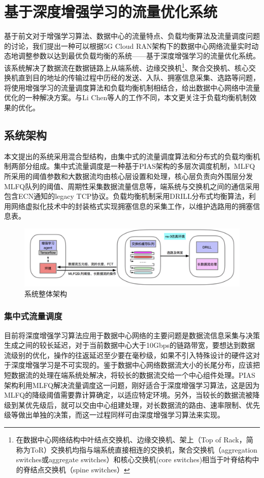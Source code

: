 
\chapter{基于深度增强学习的流量优化系统}
\label{chap:System}
基于前文对于增强学习算法、数据中心的流量特点、负载均衡算法及流量调度问题的讨论，我们提出一种可以根据5G Cloud RAN架构下的数据中心网络流量实时动态地调整参数以达到最优负载均衡的系统——基于深度增强学习的流量优化系统。该系统解决了数据流在数据链路上从端系统、边缘交换机\footnote{在数据中心网络结构中叶结点交换机、边缘交换机、架上（Top of Rack，简称为ToR）交换机均指与端系统直接相连的交换机，聚合交换机（aggregation switches或aggregate switches）和核心交换机(core switches)相当于叶脊结构中的脊结点交换机（spine switches）}、聚合交换机、核心交换机直到目的地址的传输过程中历经的发送、入队、拥塞信息采集、选路等问题，将使用增强学习的流量调度算法和负载均衡机制相结合，给出数据中心网络中流量优化的一种解决方案。与Li Chen等人的工作\cite{chen2018auto}不同，本文更关注于负载均衡机制效果的优化。

\section{系统架构}
本文提出的系统采用混合型结构，由集中式的流量调度算法和分布式的负载均衡机制两部分组成。集中式流量调度是一种基于PIAS架构的多层次调度机制，MLFQ所采用的阈值参数和大数据流均由核心层设置和处理，核心层负责向外围层分发MLFQ队列的阈值、周期性采集数据流量信息等，端系统与交换机之间的通信采用包含ECN通知的legacy TCP协议。负载均衡机制采用DRILL分布式均衡算法，利用网络虚拟化技术中的封装格式实现拥塞信息的采集工作，以维护选路用的拥塞信息表。

\begin{figure}[ht]
\centering
\includegraphics[width=16cm]{figure/architecture.png}
\caption{系统整体架构}
\label{fig:architecture}
\end{figure}
\subsection{集中式流量调度}
目前将深度增强学习算法应用于数据中心网络的主要问题是数据流信息采集与决策生成之间的较长延迟，对于当前数据中心大于10Gbps的链路带宽，要想达到数据流级别的优化，操作的往返延迟至少要在毫秒级，如果不引入特殊设计的硬件这对于深度增强学习是不可实现的。鉴于数据中心网络数据流大小的长尾分布，应该把短数据流的处理在端系统处解决，将较长的数据流交给一个中心组件处理。PIAS架构利用MLFQ解决流量调度这一问题，刚好适合于深度增强学习算法，这是因为MLFQ的降级阈值需要靠计算确定，以适应特定环境。另外，当较长的数据流被降级到某优先级后，就可以交由中心组建处理，对长数据流的路由、速率限制、优先级等做出单独的决策，而这一过程同样可由深度增强学习算法来实现。
